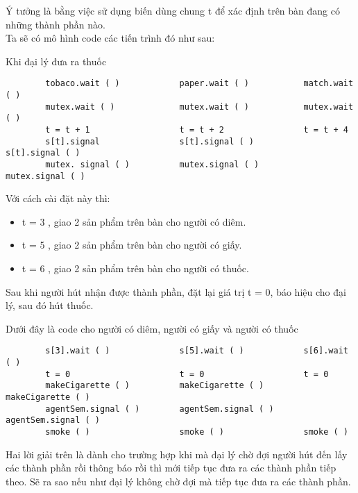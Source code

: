 \documentclass[a4paper]{article}
\begin{document}
	Ý tưởng là bằng việc sử dụng biến dùng chung t để xác định trên bàn đang có những thành phần nào. \\
	Ta sẽ có mô hình code các tiến trình đó như sau: 
	\begin{center}
		Khi đại lý đưa ra thuốc
		\begin{tcolorbox}
		\begin{verbatim}
		tobaco.wait ( )            paper.wait ( )           match.wait ( )
		mutex.wait ( )             mutex.wait ( )           mutex.wait ( )
		t = t + 1                  t = t + 2                t = t + 4
		s[t].signal                s[t].signal ( )          s[t].signal ( )
		mutex. signal ( )          mutex.signal ( )         mutex.signal ( )
		\end{verbatim}
		\end{tcolorbox}
	\end{center}

	Với cách cài đặt này thì:

	\begin{itemize}
		\item t = 3 , giao 2 sản phẩm trên bàn cho người có diêm.
		\item t = 5 , giao 2 sản phẩm trên bàn cho người có giấy.
		\item t = 6 , giao 2 sản phẩm trên bàn cho người có thuốc.
	\end{itemize}

	Sau khi người hút nhận được thành phần, đặt lại giá trị t = 0, báo hiệu cho đại lý, sau đó hút thuốc.

	Dưới đây là code cho người có diêm, người có giấy và người có thuốc
	\begin{tcolorbox}
		\begin{verbatim}
		s[3].wait ( )              s[5].wait ( )            s[6].wait ( )
		t = 0                      t = 0                    t = 0
		makeCigarette ( )          makeCigarette ( )        makeCigarette ( )
		agentSem.signal ( )        agentSem.signal ( )      agentSem.signal ( )
		smoke ( )                  smoke ( )                smoke ( )       
		\end{verbatim}
	\end{tcolorbox}
	
	
	
	Hai lời giải trên là dành cho trường hợp khi mà đại lý chờ đợi người hút đến lấy các thành phần rồi thông báo rồi
	thì mới tiếp tục đưa ra các thành phần tiếp theo. Sẽ ra sao nếu như đại lý không chờ đợi mà tiếp tục đưa 
	ra các thành phần. 
\end{document}
